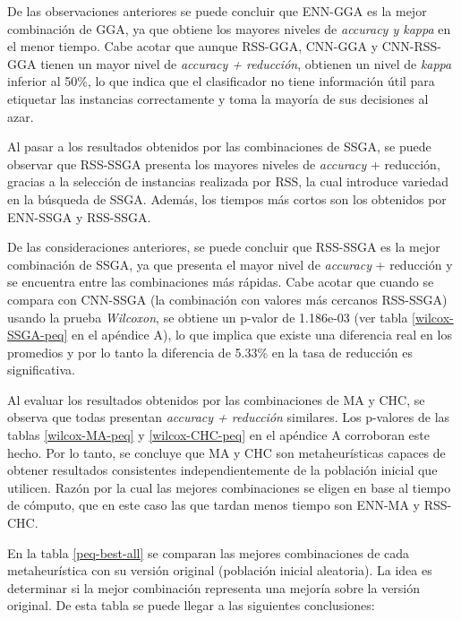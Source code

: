 De las observaciones anteriores se puede concluir que ENN-GGA es la mejor combinación de GGA, ya que obtiene los mayores niveles de \emph{accuracy y kappa} en el menor tiempo. Cabe acotar que aunque RSS-GGA, CNN-GGA y CNN-RSS-GGA tienen un mayor nivel de \emph{accuracy + reducción}, obtienen un nivel de \emph{kappa} inferior al 50\%, lo que indica que el clasificador no tiene información útil para etiquetar las instancias correctamente y toma la mayoría de sus decisiones al azar.

Al pasar a los resultados obtenidos por las combinaciones de SSGA, se puede observar que RSS-SSGA presenta los mayores niveles de \emph{accuracy} + reducción, gracias a la selección de instancias realizada por RSS, la cual introduce variedad en la búsqueda de SSGA. Además, los tiempos más cortos son los obtenidos por ENN-SSGA y RSS-SSGA. 

De las consideraciones anteriores, se puede concluir que RSS-SSGA es la mejor combinación de SSGA, ya que presenta el mayor nivel de \emph{accuracy} + reducción y se encuentra entre las combinaciones más rápidas. Cabe acotar que cuando se compara con CNN-SSGA (la combinación con valores más cercanos RSS-SSGA) usando la prueba \emph{Wilcoxon}, se obtiene un p-valor de 1.186e-03 (ver tabla \ref{wilcox-SSGA-peq} en el apéndice A), lo que implica que existe una diferencia real en los promedios y por lo tanto la diferencia de 5.33\% en la tasa de reducción es significativa.

Al evaluar los resultados obtenidos por las combinaciones de MA y CHC, se observa que todas presentan \emph{accuracy + reducción} similares. Los p-valores de las tablas \ref{wilcox-MA-peq} y \ref{wilcox-CHC-peq} en el apéndice A corroboran este hecho. Por lo tanto, se concluye que MA y CHC son metaheurísticas capaces de obtener resultados consistentes independientemente de la población inicial que utilicen. Razón por la cual las mejores combinaciones se eligen en base al tiempo de cómputo, que en este caso las que tardan menos tiempo son ENN-MA y RSS-CHC.

En la tabla \ref{peq-best-all} se comparan las mejores combinaciones de cada metaheurística con su versión original (población inicial aleatoria). La idea es determinar si la mejor combinación representa una mejoría sobre la versión original. De esta tabla se puede llegar a las siguientes conclusiones:

